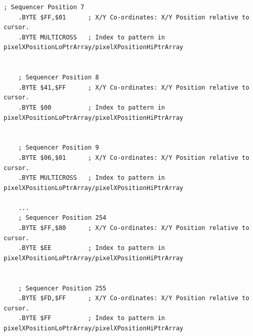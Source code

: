 \begin{lstlisting}[basicstyle=\ttfamily\tiny,caption=Sequencer definition in \icode{sequencer\_data.asm}.]
    ; Sequencer Position 7
    .BYTE $FF,$01      ; X/Y Co-ordinates: X/Y Position relative to cursor.   
    .BYTE MULTICROSS   ; Index to pattern in pixelXPositionLoPtrArray/pixelXPositionHiPtrArray   
    

    ; Sequencer Position 8
    .BYTE $41,$FF      ; X/Y Co-ordinates: X/Y Position relative to cursor.   
    .BYTE $00          ; Index to pattern in pixelXPositionLoPtrArray/pixelXPositionHiPtrArray   
    

    ; Sequencer Position 9
    .BYTE $06,$01      ; X/Y Co-ordinates: X/Y Position relative to cursor.   
    .BYTE MULTICROSS   ; Index to pattern in pixelXPositionLoPtrArray/pixelXPositionHiPtrArray   

    ...
    ; Sequencer Position 254
    .BYTE $FF,$80      ; X/Y Co-ordinates: X/Y Position relative to cursor.   
    .BYTE $EE          ; Index to pattern in pixelXPositionLoPtrArray/pixelXPositionHiPtrArray   
    

    ; Sequencer Position 255
    .BYTE $FD,$FF      ; X/Y Co-ordinates: X/Y Position relative to cursor.   
    .BYTE $FF          ; Index to pattern in pixelXPositionLoPtrArray/pixelXPositionHiPtrArray   
    
\end{lstlisting}

